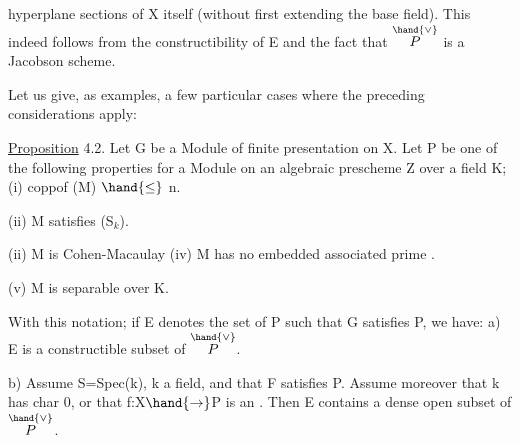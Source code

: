 
hyperplane sections of X itself (without first extending the base
field). This indeed follows from the constructibility of E and the fact
that $\overset{\hand{\vee}}{P}$ is a Jacobson scheme.

Let us give, as examples, a few particular cases where the preceding
considerations apply:

\uline{Proposition} 4.2. Let G be a Module of finite presentation on X.
Let P be one of the following properties for a Module on an algebraic
prescheme Z over a field K;
(i) coppof (M) $\hand{\leq}$ n.

(ii) M satisfies (S$_{k}$).

(ii) M is Cohen-Macaulay
(iv) M has no embedded associated prime .

(v) M is separable over  K.


 With this notation; if E denotes
the set of \hand{$\xi\in$} P such that G\hand{$_{\xi}$} satisfies P, we have:
a) E is a constructible subset of $\overset{\hand{\vee}}{P}$.

b) Assume S=Spec(k), k a field, and that F satisfies P. Assume
moreover  that k has char 0, or that f:X$\hand{\rightarrow}$P is an . 
Then E contains a dense open subset of $\overset{\hand{\vee}}{P}$.

